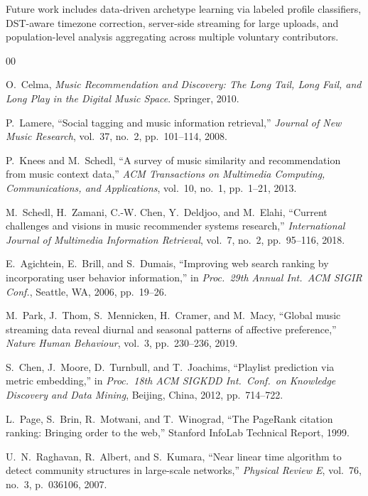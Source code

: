 \documentclass[conference]{IEEEtran}
\begin{document}
Future work includes data-driven archetype learning via labeled profile
classifiers, DST-aware timezone correction, server-side streaming for large
uploads, and population-level analysis aggregating across multiple
voluntary contributors.

\begin{thebibliography}{00}

O.~Celma, \textit{Music Recommendation and Discovery: The Long Tail, Long
Fail, and Long Play in the Digital Music Space}. Springer, 2010.

P.~Lamere, ``Social tagging and music information retrieval,''
\textit{Journal of New Music Research}, vol.~37, no.~2, pp.~101--114, 2008.

P.~Knees and M.~Schedl, ``A survey of music similarity and recommendation
from music context data,'' \textit{ACM Transactions on Multimedia Computing,
Communications, and Applications}, vol.~10, no.~1, pp.~1--21, 2013.

M.~Schedl, H.~Zamani, C.-W. Chen, Y.~Deldjoo, and M.~Elahi, ``Current
challenges and visions in music recommender systems research,''
\textit{International Journal of Multimedia Information Retrieval},
vol.~7, no.~2, pp.~95--116, 2018.

E.~Agichtein, E.~Brill, and S.~Dumais, ``Improving web search ranking by
incorporating user behavior information,'' in \textit{Proc.\ 29th Annual
Int.\ ACM SIGIR Conf.}, Seattle, WA, 2006, pp.~19--26.

M.~Park, J.~Thom, S.~Mennicken, H.~Cramer, and M.~Macy, ``Global music
streaming data reveal diurnal and seasonal patterns of affective preference,''
\textit{Nature Human Behaviour}, vol.~3, pp.~230--236, 2019.

S.~Chen, J.~Moore, D.~Turnbull, and T.~Joachims, ``Playlist prediction via
metric embedding,'' in \textit{Proc.\ 18th ACM SIGKDD Int.\ Conf.\ on
Knowledge Discovery and Data Mining}, Beijing, China, 2012, pp.~714--722.

L.~Page, S.~Brin, R.~Motwani, and T.~Winograd, ``The PageRank citation
ranking: Bringing order to the web,'' Stanford InfoLab Technical Report, 1999.

U.~N.~Raghavan, R.~Albert, and S.~Kumara, ``Near linear time algorithm to
detect community structures in large-scale networks,'' \textit{Physical
Review E}, vol.~76, no.~3, p.~036106, 2007.


\end{thebibliography}
\end{document}
